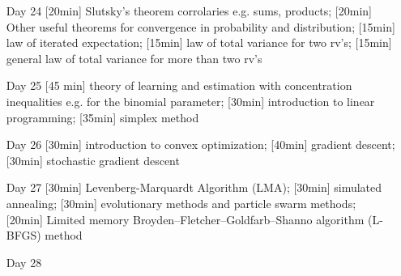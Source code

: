 \begin{enumerate}
\item[Day 24] [20min] Slutsky's theorem corrolaries e.g. sums, products; [20min] Other useful theorems for convergence in probability and distribution; [15min] law of iterated expectation; [15min] law of total variance for two rv's; [15min] general law of total variance for more than two rv's

\item[Day 25] [45 min] theory of learning and estimation with concentration inequalities e.g. for the binomial parameter; [30min] introduction to linear programming; [35min] simplex method

\item[Day 26] [30min] introduction to convex optimization; [40min] gradient descent; [30min] stochastic gradient descent

\item[Day 27] [30min] Levenberg-Marquardt Algorithm (LMA); [30min] simulated annealing; [30min] evolutionary methods and particle swarm methods; [20min] Limited memory Broyden–Fletcher–Goldfarb–Shanno algorithm (L-BFGS) method

\item[Day 28] 

\end{enumerate}